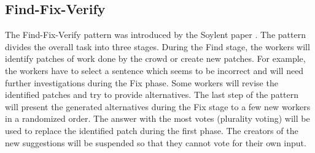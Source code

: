 \subsection{Find-Fix-Verify}
The Find-Fix-Verify pattern was introduced by the Soylent paper \cite{soylent}. The pattern divides the overall task into three stages. During the Find stage, the workers will identify patches of work done by the crowd or create new patches. For example, the workers have to select a sentence which seems to be incorrect and will need further investigations during the Fix phase. Some workers will revise the identified patches and try to provide alternatives. The last step of the pattern will present the generated alternatives during the Fix stage to a few new workers in a randomized order. The answer with the most votes (plurality voting) will be used to replace the identified patch during the first phase. The creators of the new suggestions will be suspended so that they cannot vote for their own input.

